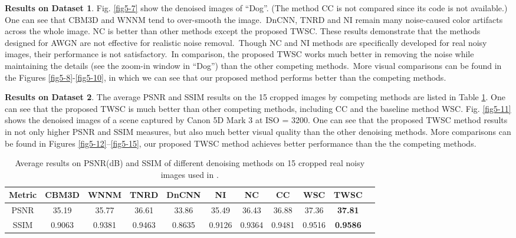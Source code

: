 \textbf{Results on Dataset 1}. Fig. \ref{fig5-7} show the denoised images of ``Dog''. (The method CC \cite{crosschannel2016} is not compared since its code is not available.) One can see that CBM3D and WNNM tend to over-smooth the image.\ DnCNN, TNRD and NI remain many noise-caused color artifacts across the whole image. NC is better than other methods except the proposed TWSC. These results demonstrate that the methods designed for AWGN are not effective for realistic noise removal.\ Though NC and NI methods are specifically developed for real noisy images, their performance is not satisfactory.\ In comparison, the proposed TWSC works much better in removing the noise while maintaining the details (see the zoom-in window in ``Dog'') than the other competing methods.\ More visual comparisons can be found in the Figures \ref{fig5-8}-\ref{fig5-10}, in which we can see that our proposed method performs better than the competing methods.

\textbf{Results on Dataset 2}. The average PSNR and SSIM results on the 15 cropped images by competing methods are listed in Table \ref{tab5-2}. One can see that the proposed TWSC is much better than other competing methods, including CC and the baseline method WSC. Fig. \ref{fig5-11} shows the denoised images of a scene captured by Canon 5D Mark 3 at ISO = 3200. One can see that the proposed TWSC method results in not only higher PSNR and SSIM measures, but also much better visual quality than the other denoising methods. More comparisons can be found in Figures \ref{fig5-12}--\ref{fig5-15}, our proposed TWSC method achieves better performance than the the competing methods.


\begin{table}[hbp]
\caption{Average results on PSNR(dB) and SSIM of different denoising methods on 15 cropped real noisy images used in \cite{crosschannel2016}.}
\label{tab5-2}
\begin{center}
\renewcommand\arraystretch{1}
\scriptsize
\begin{tabular*}{1\textwidth}{@{\extracolsep{\fill}}ccccccccccc}
\hline
Metric
&
\textbf{CBM3D}
&
\textbf{WNNM}
&
\textbf{TNRD}
&
\textbf{DnCNN}
&
\textbf{NI}
&
\textbf{NC}
&
\textbf{CC}
&
\textbf{WSC}
&
\textbf{TWSC}
\\
\hline
PSNR & 35.19 & 35.77 & 36.61 & 33.86 & 35.49 & 36.43  & 36.88 & 37.36 & \textbf{37.81}
\\
\hline
SSIM & 0.9063 & 0.9381 & 0.9463 & 0.8635 & 0.9126 & 0.9364 & 0.9481 & 0.9516 & \textbf{0.9586}
\\
\hline
\end{tabular*}
\end{center}
\end{table}

